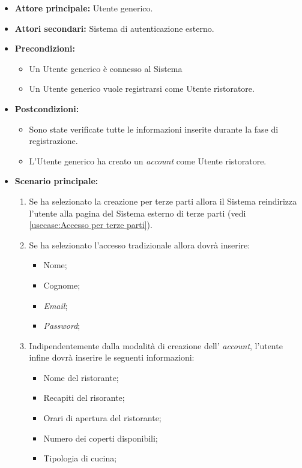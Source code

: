\label{usecase:Registrazione Utente ristoratore}
\begin{itemize}

	\item \textbf{Attore principale:} Utente generico.
	\item \textbf{Attori secondari:} Sistema di autenticazione esterno. 

	\item \textbf{Precondizioni:} 
	\begin{itemize}
        \item  Un Utente generico è connesso al Sistema
        \item  Un Utente generico vuole registrarsi come Utente ristoratore.
    \end{itemize}
    

	\item \textbf{Postcondizioni:} 
    \begin{itemize}
        \item  Sono state verificate tutte le informazioni inserite durante la fase di registrazione.
        \item  L'Utente generico ha creato un \textit{account} come Utente ristoratore.
    \end{itemize}

	\item \textbf{Scenario principale:}
	\begin{enumerate}

            \item Se ha selezionato la creazione per terze parti allora il Sistema reindirizza l'utente alla pagina del Sistema esterno di terze parti (vedi \autoref{usecase:Accesso per terze parti}).
            \item Se ha selezionato l'accesso tradizionale allora dovrà inserire:
            \begin{itemize}
                \item Nome;
                \item Cognome;
                \item \textit{Email};
                \item \textit{Password};
            \end{itemize}

            \item Indipendentemente dalla modalità di creazione dell' \textit{account}, l'utente infine dovrà inserire le seguenti informazioni:
                \begin{itemize}
                    \item Nome del ristorante;
                    \item Recapiti del risorante;
                    \item Orari di apertura del ristorante;
                    \item Numero dei coperti disponibili;
                    \item Tipologia di cucina;
                \end{itemize}
            
	\end{enumerate}
	
\end{itemize}